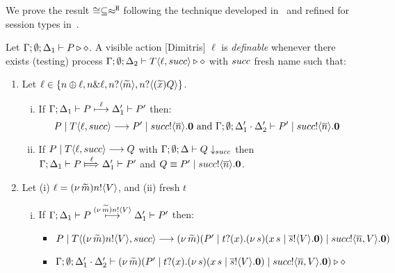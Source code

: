 We prove the result $\cong \subseteq \approx^\mathtt{H}$ following
the technique developed in~\cite{Hennessy07} and
refined for session types in~\cite{KYHH2015,KY2015}.


\begin{definition}[Definability]\myrm
	\label{app:def:definibility}
	Let $\Gamma; \emptyset; \Delta_1 \vdash P \triangleright \diamond$.
	A visible action [Dimitris] $\ell$ is \emph{definable} whenever
	there exists (testing) process
	$\Gamma; \emptyset; \Delta_2 \vdash T\langle \ell, succ \rangle \triangleright \diamond$
	with $succ$ fresh name %
	such that:
%
	\begin{enumerate}
		\item	Let $\ell \in \{n \oplus \ell, n \& \ell, n ? \langle \widetilde{m} \rangle, n ? \langle (\widetilde{x}) Q \rangle\}$.
		
			\begin{enumerate}[i.]
				\item	If $\Gamma; \Delta_1 \vdash P \stackrel{\ell}{\longmapsto} \Delta_1' \vdash P'$
						then:
						\[
							P \;|\; T\langle \ell, succ \rangle \longrightarrow P' \;|\; succ ! \langle \overline{n} \rangle . \mathbf{0} \textrm{ and }
							\Gamma; \emptyset; \Delta_1' \cdot \Delta_2' \vdash P' \;|\; succ ! \langle \overline{n} \rangle . \mathbf{0}
						\]

				\item
						If $P \;|\; T\langle \ell, succ \rangle \longrightarrow Q$ with			
						$\Gamma; \emptyset; \Delta \vdash Q \downarrow_{succ}$ then \\
						$\horel{\Gamma}{\Delta_1}{P}{\Hby{\ell}}{\Delta_1'}{P'}$
						and $Q \equiv P' \;|\; succ ! \langle \overline{n} \rangle . \mathbf{0}$.
			\end{enumerate}
%
 		\item Let	(i) $\ell = (\nu\, \widetilde{m})n ! \langle V \rangle$,
					and (ii) fresh $t$%

			\begin{enumerate}[i.]
				\item	If $\Gamma; \Delta_1 \vdash P \stackrel{(\nu\, \widetilde{m})n ! \langle V \rangle}{\longmapsto} \Delta_1' \vdash P'$
						then:
%
						\begin{itemize}
							\item $P \;|\; T\langle (\nu\, \widetilde{m})n ! \langle V \rangle, succ \rangle \longrightarrow
							(\nu\, \widetilde{m})(P' \;|\; t ? (x) . (\nu\, s)(x\, {s} \;|\; \overline{s} ! \langle V \rangle . \mathbf{0}) \;|\; succ ! \langle \overline{n}, V \rangle . \mathbf{0})$
							\item $\Gamma; \emptyset; \Delta_1' \cdot \Delta_2' \vdash
							(\nu\, \widetilde{m})(P' \;|\; t ? (x) . (\nu\, s)(x\, {s} \;|\; \overline{s} ! \langle V \rangle . \mathbf{0}) \;|\;  succ ! \langle \overline{n}, V \rangle . \mathbf{0}) \triangleright \diamond$
						\end{itemize}


\end{enumerate}
\end{enumerate}
\end{definition}
